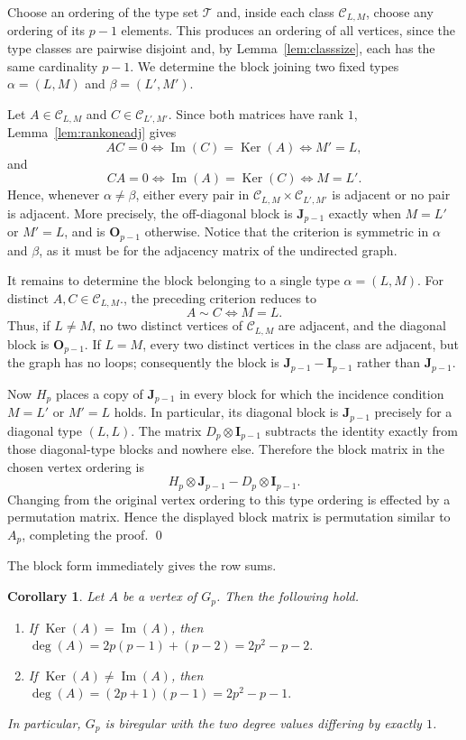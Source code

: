 \documentclass[12pt]{article}
\renewenvironment{proof}{{\bf \noindent Proof.}}{\qed}
\newtheorem{corollary}[theorem]{Corollary}
\theoremstyle{definition}
\newcommand{\calT}{\mathcal{T}}
\newcommand{\calC}{\mathcal{C}}
\newcommand{\I}{\mathbf{I}}
\newcommand{\J}{\mathbf{J}}
\renewcommand{\O}{\mathbf{O}}
\newcommand{\Ker}{\operatorname{Ker}}
\newcommand{\Image}{\operatorname{Im}}
\begin{document}
	\begin{proof}
		Choose an ordering of the type set $\calT$ and, inside each class $\calC_{L,M}$, choose any ordering of its $p-1$ elements. This produces an ordering of all vertices, since the type classes are pairwise disjoint and, by Lemma~\ref{lem:classsize}, each has the same cardinality $p-1$. We determine the block joining two fixed types $\alpha=(L,M)$ and $\beta=(L',M')$.
		
		Let $A\in\calC_{L,M}$ and $C\in\calC_{L',M'}$. Since both matrices have rank $1$, Lemma~\ref{lem:rankoneadj} gives
		$$
		AC=0\iff \Image(C)=\Ker(A)\iff M'=L,
		$$
		and
		$$
		CA=0\iff \Image(A)=\Ker(C)\iff M=L'.
		$$
		Hence, whenever $\alpha\neq\beta$, either every pair in $\calC_{L,M}\times\calC_{L',M'}$ is adjacent or no pair is adjacent. More precisely, the off-diagonal block is $\J_{p-1}$ exactly when $M=L'$ or $M'=L$, and is $\O_{p-1}$ otherwise. Notice that the criterion is symmetric in $\alpha$ and $\beta$, as it must be for the adjacency matrix of the undirected graph.
		
		It remains to determine the block belonging to a single type $\alpha=(L,M)$. For distinct $A,C\in\calC_{L,M}$., the preceding criterion reduces to
		$$
		A\sim C\iff M=L.
		$$
		Thus, if $L\neq M$, no two distinct vertices of $\calC_{L,M}$ are adjacent, and the diagonal block is $\O_{p-1}$. If $L=M$, every two distinct vertices in the class are adjacent, but the graph has no loops; consequently the block is $\J_{p-1}-\I_{p-1}$ rather than $\J_{p-1}$.
		
		Now $H_p$ places a copy of $\J_{p-1}$ in every block for which the incidence condition $M=L'$ or $M'=L$ holds. In particular, its diagonal block is $\J_{p-1}$ precisely for a diagonal type $(L,L)$. The matrix $D_p\otimes\I_{p-1}$ subtracts the identity exactly from those diagonal-type blocks and nowhere else. Therefore the block matrix in the chosen vertex ordering is
		$$
		H_p\otimes\J_{p-1}-D_p\otimes\I_{p-1}.
		$$
		Changing from the original vertex ordering to this type ordering is effected by a permutation matrix. Hence the displayed block matrix is permutation similar to $A_p$, completing the proof.
	\end{proof}
	
	\medskip
	The block form immediately gives the row sums.	
	\begin{corollary}\label{cor:degrees}
		Let $A$ be a vertex of $G_p$. Then the following hold.
		\begin{enumerate}[label=\textup{(\roman*)},noitemsep]
			\item If $\Ker(A)=\Image(A)$, then $\deg(A)=2p(p-1)+(p-2)=2p^2-p-2.$ 
			\item If $\Ker(A)\neq \Image(A)$, then $\deg(A)=(2p+1)(p-1)=2p^2-p-1.$ 
		\end{enumerate}
		In particular, $G_p$ is biregular with the two degree values differing by exactly $1$.
	\end{corollary}
	
\end{document}
